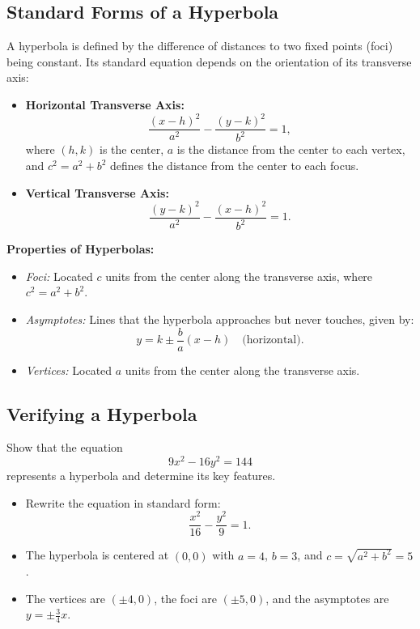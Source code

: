 \documentclass{article}
\begin{document}
\subsection*{Standard Forms of a Hyperbola}
\begin{definitionbox}
    A hyperbola is defined by the difference of distances to two fixed points (foci) being constant. Its standard equation depends on the orientation of its transverse axis:  
    \begin{itemize}
        \item \textbf{Horizontal Transverse Axis:}  
        \[
        \frac{(x-h)^2}{a^2} - \frac{(y-k)^2}{b^2} = 1,
        \]
        where \( (h, k) \) is the center, \( a \) is the distance from the center to each vertex, and \( c^2 = a^2 + b^2 \) defines the distance from the center to each focus.  
        
        \item \textbf{Vertical Transverse Axis:}  
        \[
        \frac{(y-k)^2}{a^2} - \frac{(x-h)^2}{b^2} = 1.
        \]
    \end{itemize}
    \begin{remarkbox}
        \textbf{Properties of Hyperbolas:}
        \begin{itemize}
            \item \textit{Foci:} Located \( c \) units from the center along the transverse axis, where \( c^2 = a^2 + b^2 \).
            \item \textit{Asymptotes:} Lines that the hyperbola approaches but never touches, given by:
            \[
            y = k \pm \frac{b}{a}(x-h) \quad \text{(horizontal)}.
            \]
            \item \textit{Vertices:} Located \( a \) units from the center along the transverse axis.
        \end{itemize}
        \end{remarkbox}
\end{definitionbox}

\subsection*{Verifying a Hyperbola}
\begin{examplebox}
Show that the equation  
\[
9x^2 - 16y^2 = 144
\]
represents a hyperbola and determine its key features.

\begin{solutionbox}
\begin{itemize}
    \item Rewrite the equation in standard form:
    \[
    \frac{x^2}{16} - \frac{y^2}{9} = 1.
    \]
    \item The hyperbola is centered at \( (0, 0) \) with \( a = 4 \), \( b = 3 \), and \( c = \sqrt{a^2 + b^2} = 5 \).
    \item The vertices are \( (\pm 4, 0) \), the foci are \( (\pm 5, 0) \), and the asymptotes are \( y = \pm \frac{3}{4}x \).
\end{itemize}
\end{solutionbox}
\end{examplebox}
\end{document}
